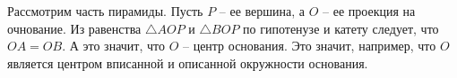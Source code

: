 Рассмотрим часть пирамиды. Пусть $P$ -- ее вершина, а $O$ -- ее проекция на очнование. Из равенства $\triangle AOP$ и $\triangle BOP$ по гипотенузе и  катету следует, что $OA=OB$. А это значит, что $O$ -- центр основания. Это значит, например, что $O$ является центром вписанной и описанной окружности основания.
